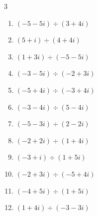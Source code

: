 \begin{multicols}{3}
\begin{enumerate}
  \item $\displaystyle (-5-5i)\div(3+4i)$


  \item $\displaystyle (5+i)\div(4+4i)$


  \item $\displaystyle (1+3i)\div(-5-5i)$


  \item $\displaystyle (-3-5i)\div(-2+3i)$


  \item $\displaystyle (-5+4i)\div(-3+4i)$


  \item $\displaystyle (-3-4i)\div(5-4i)$


  \item $\displaystyle (-5-3i)\div(2-2i)$


  \item $\displaystyle (-2+2i)\div(1+4i)$


\columnbreak %

\resetques

  \item $\displaystyle (-3+i)\div(1+5i)$


  \item $\displaystyle (-2+3i)\div(-5+4i)$


  \item $\displaystyle (-4+5i)\div(1+5i)$


  \item $\displaystyle (1+4i)\div(-3-3i)$


\end{enumerate}
\end{multicols}
